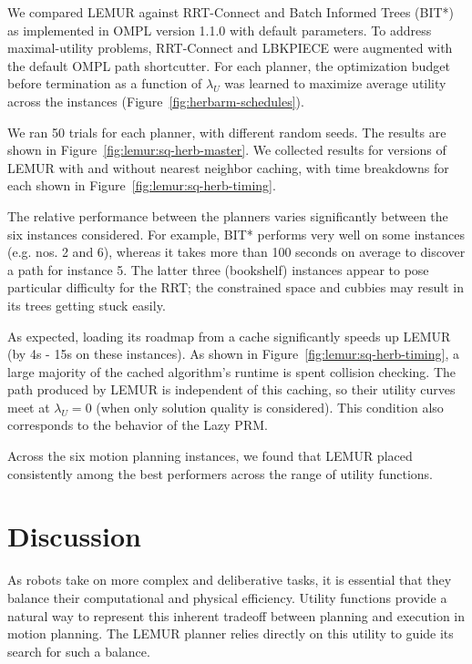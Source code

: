 We compared LEMUR against
RRT-Connect \citep{kuffner2000rrtconnect}
and Batch Informed Trees (BIT*) \citep{gammell2015bitstar}
as implemented in OMPL version 1.1.0
with default parameters.
To address maximal-utility problems,
RRT-Connect and LBKPIECE were augmented with the default OMPL
path shortcutter.
For each planner,
the optimization budget before termination
as a function of $\lambda_U$
was learned to maximize average utility across the instances
(Figure~\ref{fig:herbarm-schedules}).

We ran 50 trials for each planner,
with different random seeds.
The results are shown in Figure~\ref{fig:lemur:sq-herb-master}.
We collected results for versions of LEMUR with and without
nearest neighbor caching,
with time breakdowns for each shown in
Figure~\ref{fig:lemur:sq-herb-timing}.

The relative performance between the planners varies
significantly between the six instances considered.
For example, BIT* performs very well on some instances
(e.g. nos. 2 and 6),
whereas it takes more than 100 seconds on average to discover
a path for instance 5.
The latter three (bookshelf) instances appear to pose particular
difficulty for the RRT;
the constrained space and cubbies may result in its trees
getting stuck easily.

As expected,
loading its roadmap from a cache
significantly speeds up LEMUR (by 4s - 15s on these instances).
As shown in Figure~\ref{fig:lemur:sq-herb-timing},
a large majority of the cached algorithm's runtime is spent
collision checking.
The path produced by LEMUR is independent of this caching,
so their utility curves meet at $\lambda_U = 0$
(when only solution quality is considered).
This condition also corresponds to the behavior of the Lazy PRM.

Across the six motion planning instances,
we found that LEMUR placed consistently among the best performers
across the range of utility functions.

\section{Discussion}
\label{sec:discussion}

As robots take on more complex and deliberative tasks,
it is essential that they balance their computational and
physical efficiency.
Utility functions provide a natural way to represent this
inherent tradeoff between planning and execution
in motion planning.
The LEMUR planner relies directly on this utility
to guide its search for such a balance.

